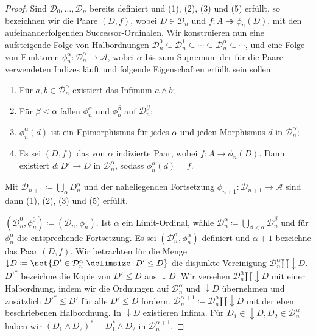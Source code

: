 \documentclass[a4paper, parskip=half]{scrartcl}
\theoremstyle{marginbreak}
\theoremstyle{nonumberplain}
\newtheorem{proof}{Beweis.}
\newcommand\cat\mathcal
\newcommand{\down}[1]{{\downarrow}#1}
\begin{document}
{\begin{proof}
			Sind $\cat{D}_0,\ldots,\cat{D}_n$ bereits definiert und (1), (2), (3)
			und (5) erfüllt, so bezeichnen wir die Paare $(D, f)$, wobei $D\in\cat{D}_n$
			und $f\colon A\twoheadrightarrow \phi_n(D)$, mit den aufeinanderfolgenden
			Successor-Ordinalen. Wir konstruieren nun eine aufsteigende Folge von
			Halbordnungen $\cat{D}_n^0\subseteq\cat{D}_n^1\subseteq\cdots\subseteq\cat{D}_n^\alpha\subseteq\cdots$,
			und eine Folge von Funktoren $\phi_n^\alpha\colon\cat{D}_n^\alpha\to\cat{A}$,
			wobei $\alpha$ bis zum Supremum der für die Paare verwendeten Indizes läuft und
			folgende Eigenschaften erfüllt sein sollen:
			\begin{enumerate}[label=(\alph*),noitemsep]
				\item Für $a, b\in\cat{D}_n^\alpha$ existiert das Infimum $a\wedge b$;
				\item Für $\beta<\alpha$ fallen $\phi_n^\alpha$ und $\phi_n^\beta$ auf $\cat{D}_n^\beta$;
				\item $\phi_n^\alpha(d)$ ist ein Epimorphismus für jedes $\alpha$ und jeden
					Morphismus $d$ in $\cat{D}_n^\alpha$;
				\item Es sei $(D, f)$ das von $\alpha$ indizierte Paar, wobei
					$f\colon A\to\phi_n(D)$. Dann existiert $d\colon D'\to D$ in
					$\cat{D}_n^\alpha$, sodass $\phi_n^\alpha(d) = f$.
			\end{enumerate}
			Mit $\cat{D}_{n+1}\coloneqq\bigcup_\alpha D_n^\alpha$ und der naheliegenden
			Fortsetzung $\phi_{n+1}\colon\cat{D}_{n+1}\to\cat{A}$ sind dann (1), (2), (3)
			und (5) erfüllt.

			$(\cat{D}_n^0, \phi_n^0)\coloneqq (\cat{D}_n, \phi_n)$. Ist $\alpha$ ein
			Limit-Ordinal, wähle $\cat{D}_n^\alpha\coloneqq\bigcup_{\beta<\alpha}\cat{D}_n^\beta$
			und für $\phi_n^\alpha$ die entsprechende Fortsetzung. Es sei $(\cat{D}_n^\alpha,
			\phi_n^\alpha)$ definiert und $\alpha+1$ bezeichne das Paar $(D, f)$.
			Wir betrachten für die Menge $\down{D}\coloneqq\set{D'\in\cat{D}_n^\alpha\given D'\leq D}$
			die disjunkte Vereinigung $\cat{D}_n^\alpha\amalg\down{D}$. $D'^*$
			bezeichne die Kopie von $D'\leq D$ aus $\down{D}$. Wir versehen
			$\cat{D}_n^\alpha\amalg\down{D}$ mit einer Halbordnung, indem wir die
			Ordnungen auf $\cat{D}_n^\alpha$ und $\down{D}$ übernehmen und zusätzlich
			$D'^*\leq D'$ für alle $D'\leq D$ fordern. $\cat{D}_n^{\alpha+1}\coloneqq
			\cat{D}_n^\alpha\amalg\down{D}$ mit der eben beschriebenen Halbordnung.
			In $\down{D}$ existieren Infima. Für $D_1\in\down{D}, D_2\in\cat{D}_n^\alpha$
			haben wir $(D_1\wedge D_2)^*=D_1^*\wedge D_2$ in $\cat{D}_n^{\alpha+1}$.


\end{proof}}
\end{document}
